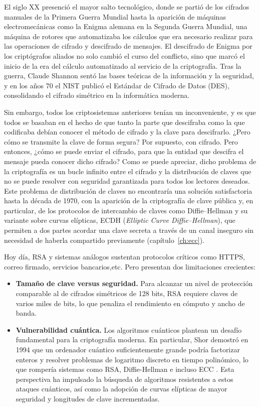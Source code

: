 El siglo XX presenció el mayor salto tecnológico, donde se partió de los cifrados manuales de la Primera Guerra Mundial hasta la aparición de máquinas electromecánicas como la Enigma alemana en la Segunda Guerra Mundial, una máquina de rotores que automatizaba los cálculos que era necesario realizar para las operaciones de cifrado y descifrado de mensajes. El descifrado de Enigma por los criptógrafos aliados no solo cambió el curso del conflicto, sino que marcó el inicio de la era del cálculo automatizado al servicio de la criptografía. Tras la guerra, Claude Shannon sentó las bases teóricas de la información y la seguridad, y en los años 70 el NIST publicó el Estándar de Cifrado de Datos (DES), consolidando el cifrado simétrico en la informática moderna.

Sin embargo, todos los criptosistemas anteriores tenían un inconveniente, y es que todos se basaban en el hecho de que tanto la parte que descifraba como la que codificaba debían conocer el método de cifrado y la clave para descifrarlo. ¿Pero cómo se transmite la clave de forma segura? Por supuesto, con cifrado. Pero entonces, ¿cómo se puede enviar el cifrado, para que la entidad que descifra el mensaje pueda conocer dicho cifrado? Como se puede apreciar, dicho problema de la criptografía es un bucle infinito entre el cifrado y la distribución de claves que no se puede resolver con seguridad garantizada para todos los lectores deseados. Este problema de distribución de claves no encontraría una solución satisfactoria hasta la década de 1970, con la aparición de la criptografía de clave pública y, en particular, de los protocolos de intercambio de claves como Diffie--Hellman y su variante sobre curvas elípticas, ECDH (\emph{Elliptic Curve Diffie--Hellman}), que permiten a dos partes acordar una clave secreta a través de un canal inseguro sin necesidad de haberla compartido previamente (capítulo~\ref{ch:ecc}).

Hoy día, RSA y sistemas análogos sustentan protocolos críticos como HTTPS, correo firmado, servicios bancarios,etc. Pero presentan dos limitaciones crecientes:  
\begin{itemize}  
  \item \textbf{Tamaño de clave versus seguridad.} Para alcanzar un nivel de protección comparable al de cifrados simétricos de 128 bits, RSA requiere claves de varios miles de bits, lo que penaliza el rendimiento en cómputo y ancho de banda.  
  \item \textbf{Vulnerabilidad cuántica.} 
  Los algoritmos cuánticos plantean un de\-safío fundamental para la criptografía moderna. En particular, Shor demostró en 1994 que un ordenador cuántico suficientemente grande podría factorizar enteros y resolver problemas de logaritmo discreto en tiempo polinómico, lo que rompería sistemas como RSA, Diffie-Hellman e incluso ECC \cite{shor-quantum-threat}\cite{paloalto-quantum-threat}. Esta perspectiva ha impulsado la búsqueda de algoritmos resistentes a estos ataques cuánticos, así como la adopción de curvas elípticas de mayor seguridad y longitudes de clave incrementadas.  
\end{itemize}  


